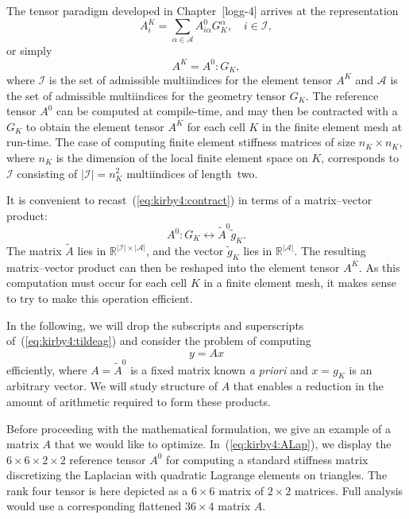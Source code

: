 The tensor paradigm developed in Chapter~[logg-4] arrives at the
representation
\begin{displaymath}
  A^K_i = \sum_{\alpha\in\mathcal{A}} A^0_{i\alpha} G_K^{\alpha},
  \quad i \in \mathcal{I},
\end{displaymath}
or simply
\begin{equation} \label{eq:kirby4:contract}
  A^K = A^0 : G_K,
\end{equation}
where $\mathcal{I}$ is the set of admissible multiindices for the
element tensor $A^K$ and $\mathcal{A}$ is the set of admissible
multiindices for the geometry tensor $G_K$. The reference tensor \(
A^0 \) can be computed at compile-time, and may then be contracted
with a \( G_K \) to obtain the element tensor $A^K$ for each cell \( K
\) in the finite element mesh at run-time.
The case of computing finite element stiffness matrices of size $n_K
\times n_K$, where $n_K$ is the dimension of the local finite element
space on $K$, corresponds to \( \mathcal{I} \) consisting of
$|\mathcal{I}| = n_K^2$ multiindices of length~two.

It is convenient to recast~(\ref{eq:kirby4:contract}) in terms of a
matrix--vector product:
\begin{equation} \label{eq:kirby4:tildeag}
  A^0 : G_K \leftrightarrow \tilde{A}^0 \tilde{g}_K.
\end{equation}
The matrix \( \tilde{A} \) lies in \( \mathbb{R}^{|\mathcal{I}| \times
  |\mathcal{A}|} \), and the vector \( \tilde{g}_{K} \) lies in
\( \mathbb{R}^{|\mathcal{A}|} \). The resulting matrix--vector product can
then be reshaped into the element tensor $A^K$. As this
computation must occur for each cell \( K \) in a finite element mesh,
it makes sense to try to make this operation efficient.

In the following, we will drop the subscripts and superscripts
of~(\ref{eq:kirby4:tildeag}) and consider the problem of computing
\[
y = A x
\]
efficiently, where \( A = \tilde{A}^0 \) is a fixed matrix
known \emph{a priori} and \( x = g_K \) is an arbitrary vector. We
will study structure of \( A \) that enables a reduction in the amount
of arithmetic required to form these products.

Before proceeding with the mathematical formulation, we give an
example of a matrix \( A \) that we would like to
optimize. In~(\ref{eq:kirby4:ALap}), we display the $6 \times 6 \times
2 \times 2$ reference tensor $A^0$ for computing a standard stiffness
matrix discretizing the Laplacian with quadratic Lagrange elements on
triangles. The rank four tensor is here depicted as a $6 \times 6$
matrix of $2 \times 2$ matrices. Full analysis would use a
corresponding flattened $36 \times 4$ matrix $A$.

